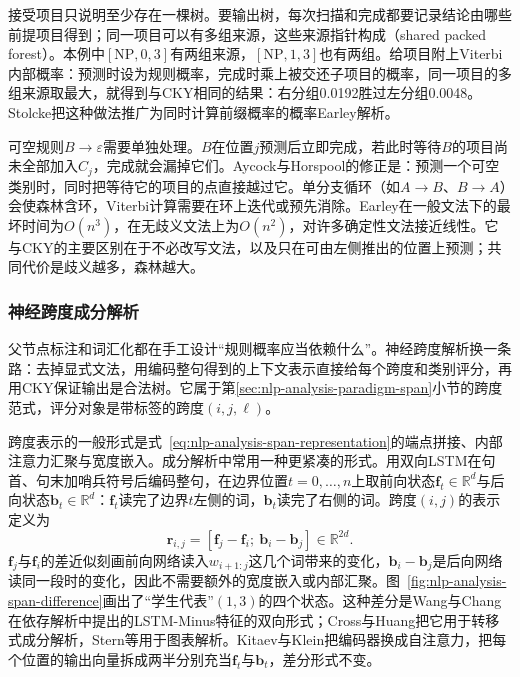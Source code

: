 接受项目只说明至少存在一棵树。要输出树，每次扫描和完成都要记录结论由哪些前提项目得到；同一项目可以有多组来源，这些来源指针构成（shared packed forest）。本例中$[\mathrm{NP},0,3]$有两组来源，$[\mathrm{NP},1,3]$也有两组。给项目附上Viterbi内部概率：预测时设为规则概率，完成时乘上被交还子项目的概率，同一项目的多组来源取最大，就得到与CKY相同的结果：右分组0.0192胜过左分组0.0048。Stolcke把这种做法推广为同时计算前缀概率的概率Earley解析。

可空规则$B\to\varepsilon$需要单独处理。$B$在位置$j$预测后立即完成，若此时等待$B$的项目尚未全部加入$C_j$，完成就会漏掉它们。Aycock与Horspool的修正是：预测一个可空类别时，同时把等待它的项目的点直接越过它。单分支循环（如$A\to B$、$B\to A$）会使森林含环，Viterbi计算需要在环上迭代或预先消除。Earley在一般文法下的最坏时间为$O(n^3)$，在无歧义文法上为$O(n^2)$，对许多确定性文法接近线性。它与CKY的主要区别在于不必改写文法，以及只在可由左侧推出的位置上预测；共同代价是歧义越多，森林越大。

\subsubsection{神经跨度成分解析}
\label{sec:nlp-analysis-neural-cky}

父节点标注和词汇化都在手工设计“规则概率应当依赖什么”。神经跨度解析换一条路：去掉显式文法，用编码整句得到的上下文表示直接给每个跨度和类别评分，再用CKY保证输出是合法树。它属于第\ref{sec:nlp-analysis-paradigm-span}小节的跨度范式，评分对象是带标签的跨度$(i,j,\ell)$。

跨度表示的一般形式是式~\eqref{eq:nlp-analysis-span-representation}的端点拼接、内部注意力汇聚与宽度嵌入。成分解析中常用一种更紧凑的形式。用双向LSTM在句首、句末加哨兵符号后编码整句，在边界位置$t=0,\ldots,n$上取前向状态$\bm f_t\in\mathbb R^d$与后向状态$\bm b_t\in\mathbb R^d$：$\bm f_t$读完了边界$t$左侧的词，$\bm b_t$读完了右侧的词。跨度$(i,j)$的表示定义为
\begin{equation}
 \bm r_{i,j}=[\bm f_j-\bm f_i;\ \bm b_i-\bm b_j]\in\mathbb R^{2d}.
 \label{eq:nlp-analysis-span-difference}
\end{equation}
$\bm f_j$与$\bm f_i$的差近似刻画前向网络读入$w_{i+1:j}$这几个词带来的变化，$\bm b_i-\bm b_j$是后向网络读同一段时的变化，因此不需要额外的宽度嵌入或内部汇聚。图~\ref{fig:nlp-analysis-span-difference}画出了“学生代表”$(1,3)$的四个状态。这种差分是Wang与Chang在依存解析中提出的LSTM-Minus特征的双向形式；Cross与Huang把它用于转移式成分解析，Stern等用于图表解析\cite{nlp-analysis-cross2016,nlp-analysis-stern2017}。Kitaev与Klein把编码器换成自注意力，把每个位置的输出向量拆成两半分别充当$\bm f_t$与$\bm b_t$，差分形式不变。

